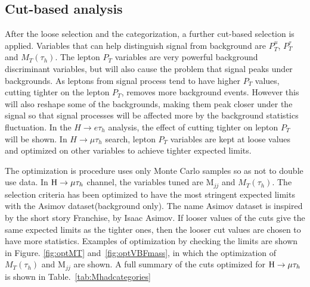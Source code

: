 \subsection{Cut-based analysis}
After the loose selection and the categorization, a further cut-based selection is applied. Variables that can help distinguish signal from background are $P_{T}^{\mu}$, $P_{T}^{\tau}$ and $M_{T}(\tau_{h})$. The lepton $P_{T}$ variables are very powerful background discriminant variables, but will also cause the problem that signal peaks under backgrounds. As leptons from signal process  tend to have higher $P_{T}$ values, cutting tighter on the lepton $P_{T}$, removes more background events. However this will also reshape some of the backgrounds, making them peak closer under the signal so that signal processes will be affected more by the background statistics fluctuation. In the $H\rightarrow e\tau_h$ analysis, the effect of cutting tighter on lepton $P_{T}$ will be shown. In $H\rightarrow\mu\tau_h$ search, lepton $P_{T}$ variables are kept at loose values and optimized on other variables to achieve tighter expected limits. 

The optimization is procedure uses only Monte Carlo samples so as not to double use data. In $\mathrm{H}\to \mu\tau_{h}$  channel, the variables tuned are $\textrm{M}_{jj}$ and $M_{T}(\tau_{h})$. The selection criteria has been optimized to have the most stringent expected limits with the Asimov dataset(background only). The name Asimov dataset is inspired by the short story Franchise, by Isaac Asimov. If looser values of the cuts give the same expected limits as the tighter ones, then the looser cut values are chosen to have more statistics. Examples of optimization by checking the limits are shown in Figure. \ref{fig:optMT} and~\ref{fig:optVBFmass}, in which the optimization of $M_T(\tau_{h})$  and $\textrm{M}_{jj}$ are shown. A full summary of the cuts optimized for $\mathrm{H}\to \mu\tau_{h}$ is shown in Table.~\ref{tab:Mhadcategories}


